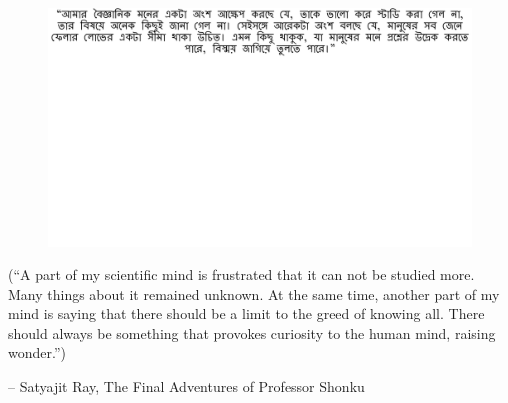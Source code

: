 \thispagestyle{empty}
{}

\vspace*{3cm}

\begin{center}
\begin{figure}
  \centering
  	\vspace{5cm}
    \includegraphics[width=\linewidth]{preamble/quote_1.pdf} 
\end{figure}
\vspace{-4cm}
\small
(``A part of my scientific mind is frustrated that it can not be studied more. Many things about it remained unknown. At the same time, another part of my mind is saying that there should be a limit to the greed of knowing all. There should always be something that provokes curiosity to the human mind, raising wonder.'')

\vspace{2em}
 -- Satyajit Ray, The Final Adventures of Professor Shonku 
\end{center}

\medskip
